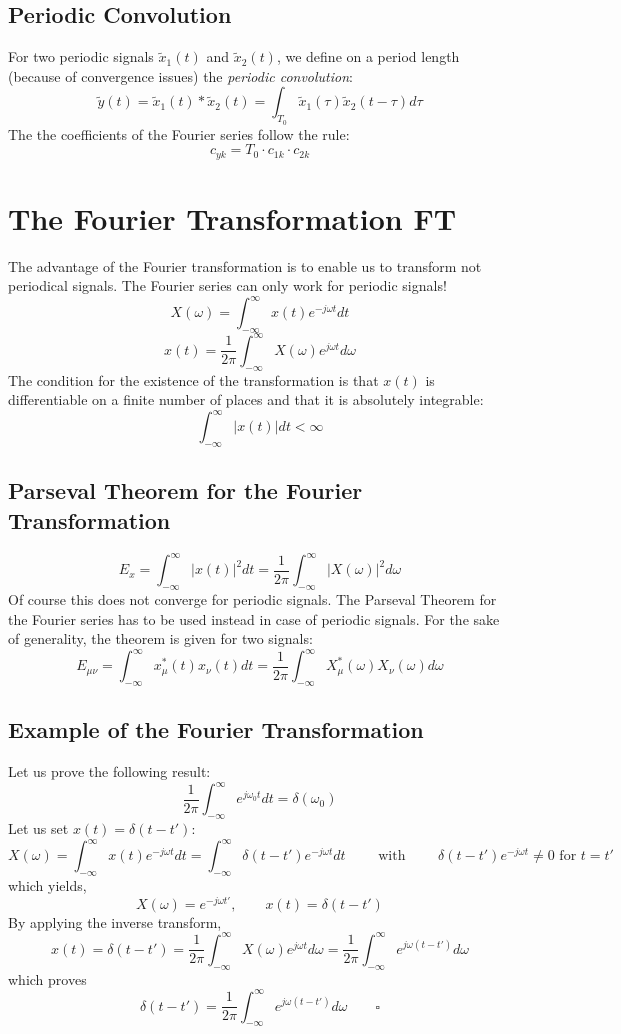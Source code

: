\documentclass[10pt,a4paper]{article}
\begin{document}
\subsection{Periodic Convolution}
For two periodic signals $\tilde{x}_1(t)$ and $\tilde{x}_2(t)$, we define on a period length (because of convergence issues) the \textit{periodic convolution}:
$$
\tilde{y}(t) = \tilde{x}_1(t) * \tilde{x}_2(t) 
			 = \int_{T_0}{\tilde{x}_1(\tau) \tilde{x}_2(t-\tau)} d\tau
$$ 
The the coefficients of the Fourier series follow the rule: 
$$
\boxed{ c_{yk} = T_0 \cdot c_{1k} \cdot c_{2k} }
$$


\section{The Fourier Transformation FT}
The advantage of the Fourier transformation is to enable us to transform not periodical signals. The Fourier series can only work for periodic signals!
$$
\boxed{
X(\omega) = \int_{-\infty}^{\infty} x(t) e^{-j \omega t} dt
}
$$
$$
\boxed{
x(t) = \frac{1}{2\pi} \int_{-\infty}^{\infty} X(\omega) e^{j \omega t} d\omega
}
$$
The condition for the existence of the transformation is that $x(t)$ is differentiable on a finite number of places and that it is absolutely integrable:
$$
\int_{-\infty}^{\infty} \vert x(t) \vert dt < \infty
$$

\subsection{Parseval Theorem for the Fourier Transformation}
$$
\boxed{
E_x = \int_{-\infty}^{\infty} \vert x(t) \vert ^2 dt 
	= \frac{1}{2\pi} \int_{-\infty}^{\infty} \vert X(\omega) \vert^2 d\omega
}
$$
Of course this does not converge for periodic signals. The Parseval Theorem for the Fourier series has to be used instead in case of periodic signals. For the sake of generality, the theorem is given for two signals: 
$$
E_{\mu \nu} = \int_{-\infty}^{\infty} x_\mu^*(t)x_\nu(t) dt 
			= \frac{1}{2\pi}\int_{-\infty}^{\infty} X_\mu^*(\omega)X_\nu(\omega) d\omega
$$
\subsection{Example of the Fourier Transformation}
Let us prove the following result: 
$$
\boxed{
\frac{1}{2\pi} \int_{-\infty}^{\infty} e^{j\omega_0t} dt = \delta(\omega_0)
}
$$
Let us set $x(t) = \delta(t-t')$:
$$
X(\omega) = \int_{-\infty}^{\infty} x(t) e^{-j \omega t} dt
		  = \int_{-\infty}^{\infty} \delta(t-t') e^{-j \omega t} dt
\qquad \text{ with } \qquad \delta(t-t') e^{-j \omega t} \neq 0 \text{ for } t = t'
$$
which yields,
$$
X(\omega) = e^{-j \omega t'}, \qquad x(t) = \delta(t-t')
$$
By applying the inverse transform,
$$
x(t) = \delta(t-t') 
	 = \frac{1}{2\pi} \int_{-\infty}^{\infty} X(\omega) e^{j \omega t} d\omega
	 = \frac{1}{2\pi} \int_{-\infty}^{\infty} e^{j \omega (t-t')} d\omega
$$
which proves
$$
\delta(t-t') = \frac{1}{2\pi} \int_{-\infty}^{\infty} e^{j \omega (t-t')} d\omega
\qquad \square
$$
\end{document}

